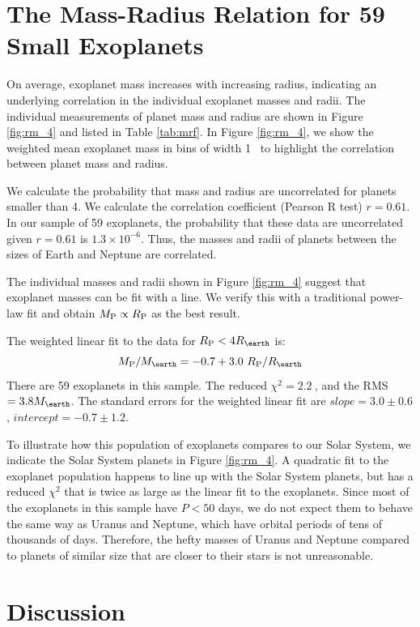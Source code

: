 \documentclass[iop]{emulateapj}
\newcommand{\rspecial}{4 \rearth}
\newcommand{\chisquared}{2.2~}
\newcommand{\rms}{3.8 \mearth}
\begin{document}
\section{The Mass-Radius Relation for 59 Small Exoplanets}
On average, exoplanet mass increases with increasing radius, indicating an underlying correlation in the individual exoplanet masses and radii.  The individual measurements of planet mass and radius are shown in Figure \ref{fig:rm_4} and listed in Table \ref{tab:mrf}.  In Figure \ref{fig:rm_4}, we show the weighted mean exoplanet mass in bins of width 1 \rearth\ to highlight the correlation between planet mass and radius.

We calculate the probability that mass and radius are uncorrelated for planets smaller than 4\rearth.  We calculate the correlation coefficient (Pearson R test) $r=0.61$.  In our sample of 59 exoplanets, the probability that these data are uncorrelated given $r = 0.61$ is $1.3 \times 10^{-6}$.  Thus, the masses and radii of planets between the sizes of Earth and Neptune are correlated.

The individual masses and radii shown in Figure \ref{fig:rm_4} suggest that exoplanet masses can be fit with a line.  We verify this with a traditional power-law fit and obtain $M_{\rm P} \propto R_{\rm P}$ as the best result.

The weighted linear fit to the data for $\rpl < \rspecial$ is:
$$
\mpl/\mearth = -0.7 +     3.0~\rpl/\rearth
$$
There are 59 exoplanets in this sample.  The reduced $\chi^2=\chisquared$, and the RMS $=\rms$.  The standard errors for the weighted linear fit are $slope = 3.0 \pm 0.6$, $intercept=-0.7\pm1.2$.

To illustrate how this population of exoplanets compares to our Solar System, we indicate the Solar System planets in Figure \ref{fig:rm_4}.  A quadratic fit to the exoplanet population happens to line up with the Solar System planets, but has a reduced $\chi^2$ that is twice as large as the linear fit to the exoplanets.  Since most of the exoplanets in this sample have $P < 50$ days, we do not expect them to behave the same way as Uranus and Neptune, which have orbital periods of tens of thousands of days.  Therefore, the hefty masses of Uranus and Neptune compared to planets of similar size that are closer to their stars is not unreasonable.

\section{Discussion}
	
\end{document}
